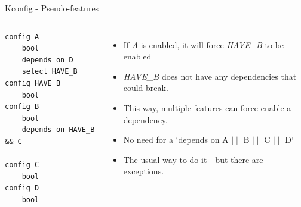 \documentclass[mathserif,serif]{beamer}
\newenvironment{items}{
\begin{itemize}
  \setlength{\itemsep}{0pt}
  \setlength{\parskip}{7pt}
  \setlength{\parsep}{4pt}
}{\end{itemize}}
\begin{document}
\begin{frame}[t,fragile]{Kconfig - Pseudo-features}

    \begin{columns}[T]

    \begin{lstlisting}
config A
    bool
    depends on D
    select HAVE_B
config HAVE_B
    bool
config B
    bool
    depends on HAVE_B && C

config C
    bool
config D
    bool
    \end{lstlisting}


    \begin{items}
        \item If \emph{A} is enabled, it will force \emph{HAVE\_B} to be enabled
        \item \emph{HAVE\_B} does not have any dependencies that could break.
        \item This way, multiple features can force enable a dependency.
        \item No need for a `depends on A $\mid\mid$ B $\mid\mid$ C $\mid\mid$ D`
        \item The usual way to do it - but there are exceptions.
    \end{items}

    \end{columns}
\end{frame}
\end{document}
